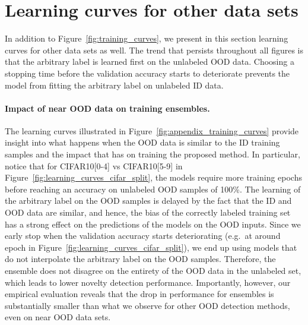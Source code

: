 \section{Learning curves for other data sets}
\label{sec:appendix_learning_curves}

In addition to Figure~\ref{fig:training_curves}, we present in this section learning curves for
other data sets as well. The trend that persists throughout all figures is that
the arbitrary label is learned first on the unlabeled OOD data. Choosing a
stopping time before the validation accuracy starts to deteriorate prevents the
model from fitting the arbitrary label on unlabeled ID data.

\paragraph{Impact of near OOD data on training  ensembles.} The
learning curves illustrated in Figure~\ref{fig:appendix_training_curves} provide
insight into what happens when the OOD data is similar to the ID training
samples and the impact that has on training the proposed method. In particular,
notice that for CIFAR10[0-4] vs CIFAR10[5-9] in
Figure~\ref{fig:learning_curves_cifar_split}, the models require more training
epochs before reaching an accuracy on unlabeled OOD samples of 100\%. The
learning of the arbitrary label on the OOD samples is delayed by the fact that
the ID and OOD data are similar, and hence, the bias of the correctly labeled
training set has a strong effect on the predictions of the models on the OOD
inputs. Since we early stop when the validation accuracy starts deteriorating
(e.g.\ at around epoch  in Figure~\ref{fig:learning_curves_cifar_split}), we
end up using models that do not interpolate the arbitrary label on the OOD
samples. Therefore, the ensemble does not disagree on the entirety of the OOD
data in the unlabeled set, which leads to lower novelty detection performance.
Importantly, however, our empirical evaluation reveals that the drop in
performance for  ensembles is substantially smaller than what we
observe for other OOD detection methods, even on near OOD data sets.

